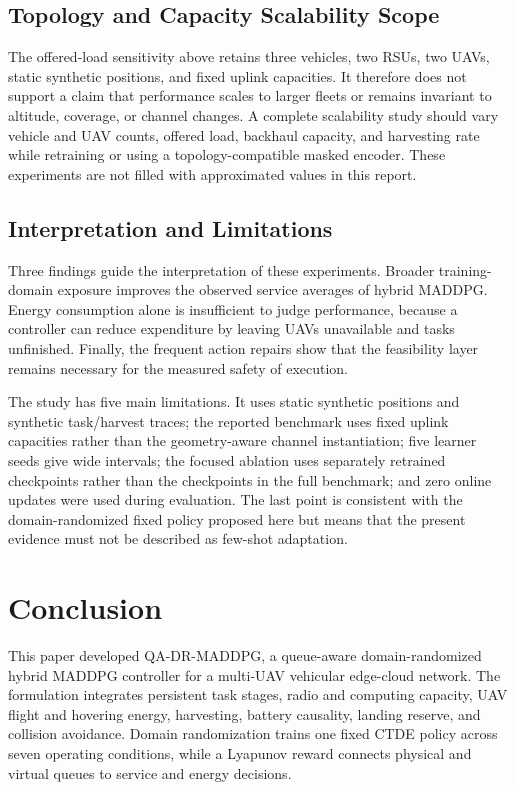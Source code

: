 \documentclass[journal]{IEEEtran}
\newcommand{\method}{QA-DR-MADDPG}
\begin{document}
\subsection{Topology and Capacity Scalability Scope}
The offered-load sensitivity above retains three vehicles,
two RSUs, two UAVs, static synthetic positions, and fixed uplink capacities.
It therefore does not support a claim that performance scales to larger fleets
or remains invariant to altitude, coverage, or channel changes. A complete
scalability study should vary vehicle and UAV counts, offered load, backhaul
capacity, and harvesting rate while retraining or using a topology-compatible
masked encoder. These experiments are not filled with approximated values in
this report.

\subsection{Interpretation and Limitations}
Three findings guide the interpretation of these experiments. Broader
training-domain exposure improves the observed service averages of hybrid
MADDPG. Energy consumption alone is insufficient to judge performance,
because a controller can reduce expenditure by leaving UAVs unavailable and
tasks unfinished. Finally, the frequent action repairs show that the
feasibility layer remains necessary for the measured safety of execution.

The study has five main limitations. It uses static synthetic positions and
synthetic task/harvest traces; the reported benchmark uses fixed uplink
capacities rather than the geometry-aware channel instantiation; five learner
seeds give wide intervals; the focused ablation uses separately retrained
checkpoints rather than the checkpoints in the full benchmark; and zero online
updates were used during evaluation. The last point is consistent with the
domain-randomized fixed policy proposed here but means that the present
evidence must not be described as few-shot adaptation.

\section{Conclusion}
This paper developed \method, a queue-aware domain-randomized hybrid MADDPG
controller for a multi-UAV vehicular edge-cloud network. The formulation
integrates persistent task stages, radio and computing capacity, UAV flight
and hovering energy, harvesting, battery causality, landing reserve, and
collision avoidance. Domain randomization trains one fixed CTDE policy across
seven operating conditions, while a Lyapunov reward connects physical and
virtual queues to service and energy decisions.
\end{document}
